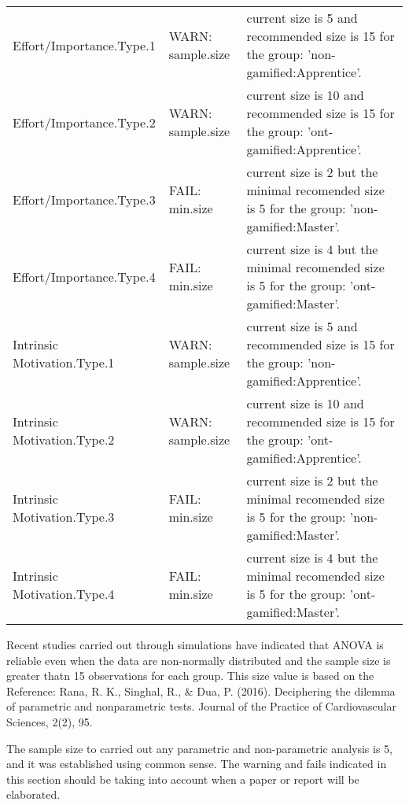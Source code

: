\documentclass[6pt,a4paper]{article}
\begin{document}
\begin{landscape}
{\begin{longtable}{lll}
Effort/Importance.Type.1&WARN: sample.size&current size is 5 and recommended size is 15 for the group: 'non-gamified:Apprentice'.\tabularnewline
Effort/Importance.Type.2&WARN: sample.size&current size is 10 and recommended size is 15 for the group: 'ont-gamified:Apprentice'.\tabularnewline
Effort/Importance.Type.3&FAIL: min.size&current size is 2 but the minimal recomended size is 5 for the group: 'non-gamified:Master'.\tabularnewline
Effort/Importance.Type.4&FAIL: min.size&current size is 4 but the minimal recomended size is 5 for the group: 'ont-gamified:Master'.\tabularnewline
Intrinsic Motivation.Type.1&WARN: sample.size&current size is 5 and recommended size is 15 for the group: 'non-gamified:Apprentice'.\tabularnewline
Intrinsic Motivation.Type.2&WARN: sample.size&current size is 10 and recommended size is 15 for the group: 'ont-gamified:Apprentice'.\tabularnewline
Intrinsic Motivation.Type.3&FAIL: min.size&current size is 2 but the minimal recomended size is 5 for the group: 'non-gamified:Master'.\tabularnewline
Intrinsic Motivation.Type.4&FAIL: min.size&current size is 4 but the minimal recomended size is 5 for the group: 'ont-gamified:Master'.\tabularnewline
\hline
\end{longtable}}

Recent studies carried out through simulations have indicated that ANOVA is reliable even when the data are non-normally distributed and the sample size is greater thatn 15 observations for each group.
This size value is based on the Reference:
Rana, R. K., Singhal, R., \& Dua, P. (2016). Deciphering the dilemma of parametric and nonparametric tests. Journal of the Practice of Cardiovascular Sciences, 2(2), 95.

The sample size to carried out any parametric and non-parametric analysis is 5, and it was established using common sense.
The warning and fails indicated in this section should be taking into account when a paper or report will be elaborated.
\end{landscape}
\end{document}
